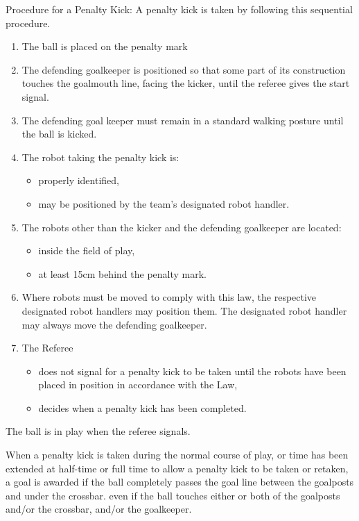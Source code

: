 \documentclass[12pt]{hurocup}
\begin{document}
\begin{lawlist}[US]
\item Procedure for a Penalty Kick: A penalty kick is taken by
  following this sequential procedure.
  \begin{enumerate}
    \item The ball is placed on the penalty mark
    \item  The defending goalkeeper is positioned so that some part of
      its construction touches the goalmouth line, facing the kicker,
      until the referee gives the start signal.
    \item The defending goal keeper must remain in a standard walking
      posture until the ball is kicked.
    \item The robot taking the penalty kick is: 
      \begin{itemize}
      \item properly identified,
      \item may be positioned by the team's designated robot handler.
      \end{itemize}
    \item The robots other than the kicker and the defending goalkeeper
      are located:
      \label{pk-other-players}
      \begin{itemize}
      \item inside the field of play,
      \item at least 15cm behind the penalty mark.
      \end{itemize}
    \item Where robots must be moved to comply with this law, the
      respective designated robot handlers may position them. The
      designated robot handler may always move the defending goalkeeper. 
    \item The Referee
      \begin{itemize}
      \item does not signal for a penalty kick to be taken until the
        robots have been placed in position in accordance with the Law,
      \item decides when a penalty kick has been completed.
      \end{itemize}
  \end{enumerate}   
  
\item The ball is in play when the referee signals.
  
\item When a penalty kick is taken during the normal course of play,
  or time has been extended at half-time or full time to allow a
  penalty kick to be taken or retaken, a goal is awarded if the ball
  completely passes the goal line between the goalposts and under the
  crossbar.  even if the ball touches either or both of the goalposts
  and/or the crossbar, and/or the goalkeeper.


\end{lawlist}
\end{document}
